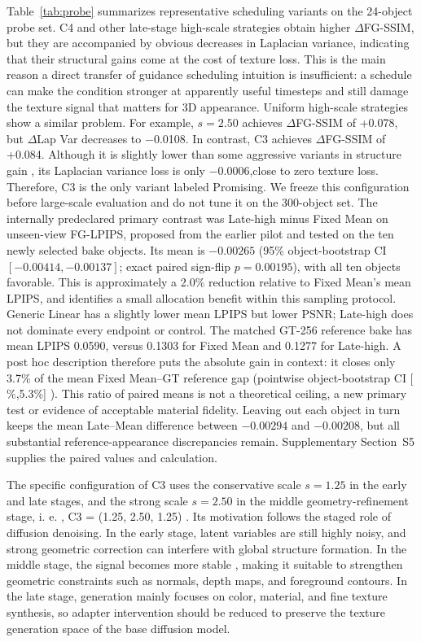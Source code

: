 \documentclass[times,twocolumn,final]{elsarticle}
\providecommand{\DIFadd}[1]{{\protect\color{blue} \sf #1}} %
\providecommand{\DIFdel}[1]{{\protect\color{red} \scriptsize #1}} %
\providecommand{\DIFaddbegin}{} %
\providecommand{\DIFaddend}{} %
\providecommand{\DIFdelbegin}{} %
\providecommand{\DIFdelend}{} %
\begin{document}
\DIFdelbegin \DIFdel{Table~\ref{tab:probe} summarizes representative scheduling variants on the 24-object probe set. C4 and other late-stage high-scale strategies obtain higher $\Delta$FG-SSIM, but they are accompanied by obvious decreases in Laplacian variance, indicating that their structural gains come at the cost of texture loss. This is the main reason a direct transfer of guidance scheduling intuition is insufficient: a schedule can make the condition stronger at apparently useful timesteps and still damage the texture signal that matters for 3D appearance. Uniform high-scale strategies show a similar problem. For example, $s = 2.50$ achieves $\Delta$FG-SSIM of +0.078, but $\Delta$Lap Var decreases to $-$0.0108. In contrast, C3 achieves $\Delta$FG-SSIM of +0.084. Although it is slightly lower than some aggressive variants in structure gain , its Laplacian variance loss is only $-$0.0006,close to zero texture loss. Therefore, C3 is the only variant labeled Promising. We freeze this configuration before large-scale evaluation and do not tune it on the 300-object set.
}\DIFdelend \DIFaddbegin \DIFadd{The internally predeclared primary contrast was Late-high minus Fixed Mean on unseen-view FG-LPIPS, proposed from the earlier pilot and tested on the ten newly selected bake objects. Its mean is $-0.00265$ (95\% object-bootstrap CI $[-0.00414,-0.00137]$; exact paired sign-flip $p=0.00195$), with all ten objects favorable. This is approximately a 2.0\% reduction relative to Fixed Mean's mean LPIPS, and identifies a small allocation benefit within this sampling protocol. Generic Linear has a slightly lower mean LPIPS but lower PSNR; Late-high does not dominate every endpoint or control. The matched GT-256 reference bake has mean LPIPS 0.0590, versus 0.1303 for Fixed Mean and 0.1277 for Late-high. A post hoc description therefore puts the absolute gain in context: it closes only 3.7\% of the mean Fixed Mean--GT reference gap (pointwise object-bootstrap CI }[\DIFadd{2.3\%,5.3\%}]\DIFadd{). This ratio of paired means is not a theoretical ceiling, a new primary test or evidence of acceptable material fidelity. Leaving out each object in turn keeps the mean Late--Mean difference between $-0.00294$ and $-0.00208$, but all substantial reference-appearance discrepancies remain. Supplementary Section~S5 supplies the paired values and calculation.
}\DIFaddend 

\DIFdelbegin \DIFdel{The specific configuration of C3 uses the conservative scale $s = 1.25$ in the early and late stages, and the strong scale $s = 2.50$ in the middle geometry-refinement stage, i. e.
, C3 = (1.25, 2.50, 1.25) . Its motivation follows the staged role of diffusion denoising. In the early stage, latent variables are still highly noisy, and strong geometric correction can interfere with global structure formation. In the middle stage, the signal becomes more stable , making it suitable to strengthen geometric constraints such as normals, depth maps, and foreground contours. In the late stage, generation mainly focuses on color, material, and fine texture synthesis, so adapter intervention should be reduced to preserve the texture generation space of the base diffusion model. }%
\end{document}

